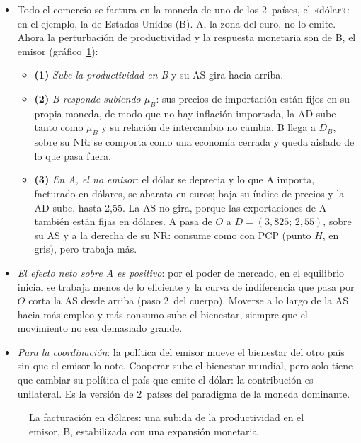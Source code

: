 \documentclass[11pt]{article}
\begin{document}
\begin{itemize}
\item Todo el comercio se factura en la moneda de uno de los 2~países, el «dólar»: en el ejemplo, la de Estados Unidos (B). A, la zona del euro, no lo emite. Ahora la perturbación de productividad y la respuesta monetaria son de B, el emisor (gráfico~\ref{fig:cp-dolar}):
  \begin{itemize}
  \item \textbf{(1)} \emph{Sube la productividad en B} y su AS gira hacia arriba.
  \item \textbf{(2)} \emph{B responde subiendo $\mu_B$}: sus precios de importación están fijos en su propia moneda, de modo que no hay inflación importada, la AD sube tanto como $\mu_B$ y su relación de intercambio no cambia. B llega a $D_B$, sobre su NR: se comporta como una economía cerrada y queda aislado de lo que pasa fuera.
  \item \textbf{(3)} \emph{En A, el no emisor}: el dólar se deprecia y lo que A importa, facturado en dólares, se abarata en euros; baja su índice de precios y la AD sube, hasta 2,55. La AS no gira, porque las exportaciones de A también están fijas en dólares. A pasa de $O$ a $D=(3{,}825;\,2{,}55)$, sobre su AS y a la derecha de su NR: consume como con PCP (punto $H$, en gris), pero trabaja más.
  \end{itemize}
\item \emph{El efecto neto sobre A es positivo}: por el poder de mercado, en el equilibrio inicial se trabaja menos de lo eficiente y la curva de indiferencia que pasa por $O$ corta la AS desde arriba (paso 2~del cuerpo). Moverse a lo largo de la AS hacia más empleo y más consumo sube el bienestar, siempre que el movimiento no sea demasiado grande.
\item \emph{Para la coordinación}: la política del emisor mueve el bienestar del otro país sin que el emisor lo note. Cooperar sube el bienestar mundial, pero solo tiene que cambiar su política el país que emite el dólar: la contribución es unilateral\nocite{CorsettiPesenti2009}. Es la versión de 2~países del paradigma de la moneda dominante\nocite{Gopinath2020DCP}.
\end{itemize}

\begin{figure}[H]
\centering
\caption{La facturación en dólares: una subida de la productividad en el emisor, B, estabilizada con una expansión monetaria}\label{fig:cp-dolar}
\end{figure}
\end{document}
